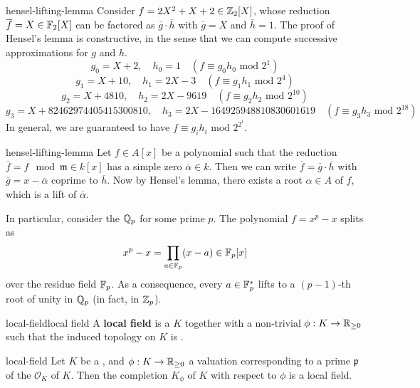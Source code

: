 \begin{example}{hensel-lifting-lemma}
    Consider $f = 2X^2 + X + 2 \in \mathbb{Z}_2[X]$, whose reduction $\overline{f} = X \in \mathbb{F}_2[X]$ can be factored as $\overline{g} \cdot \overline{h}$ with $\overline{g} = X$ and $\overline{h} = 1$. The proof of Hensel's lemma is constructive, in the sense that we can compute successive approximations for $g$ and $h$.
    \[ g_0 = X + 2, \quad h_0 = 1 \quad (f \equiv g_0 h_0 \text{ mod } 2^1) \]
    \[ g_1 = X + 10, \quad h_1 = 2X - 3 \quad (f \equiv g_1 h_1 \text{ mod } 2^4) \]
    \[ g_2 = X + 4810, \quad h_2 = 2X - 9619 \quad (f \equiv g_2 h_2 \text{ mod } 2^{10}) \]
    \[ g_3 = X + 82462974405415300810, \quad h_3 = 2X - 164925948810830601619 \quad (f \equiv g_3 h_3 \text{ mod } 2^{18}) \]
    In general, we are guaranteed to have $f \equiv g_i h_i \text{ mod } 2^{2^i}$.
\end{example}

\begin{example}{hensel-lifting-lemma}
    Let $f \in A[x]$ be a polynomial such that the reduction $\overline{f} = f \mod \mathfrak{m} \in k[x]$ has a simple zero $\overline{\alpha} \in k$. Then we can write $\overline{f} = \overline{g} \cdot \overline{h}$ with $\overline{g} = x - \overline{\alpha}$ coprime to $\overline{h}$. Now by Hensel's lemma, there exists a root $\alpha \in A$ of $f$, which is a lift of $\overline{\alpha}$.
    
    In particular, consider the  $\mathbb{Q}_p$ for some prime $p$. The polynomial $f = x^p - x$ splits as
    \[ x^p - x = \prod_{a \in \mathbb{F}_p} (x - a) \in \mathbb{F}_p[x] \]
    over the residue field $\mathbb{F}_p$. As a consequence, every $a \in \mathbb{F}_p^*$ lifts to a $(p - 1)$-th root of unity in $\mathbb{Q}_p$ (in fact, in $\mathbb{Z}_p$).
\end{example}

\begin{topic}{local-field}{local field}
    A \textbf{local field} is a  $K$ together with a non-trivial  $\phi : K \to \mathbb{R}_{\ge 0}$ such that the induced topology on $K$ is .
\end{topic}

\begin{example}{local-field}
    Let $K$ be a , and $\phi : K \to \mathbb{R}_{\ge 0}$ a valuation corresponding to a prime $\mathfrak{p}$ of the  $\mathcal{O}_K$ of $K$. Then the completion $K_\phi$ of $K$ with respect to $\phi$ is a local field.
\end{example}


